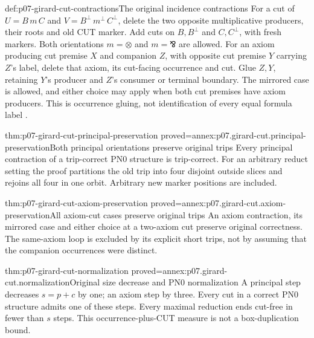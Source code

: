 \begin{hbdefinition}{def:p07-girard-cut-contractions}{The original incidence contractions}
For a cut of \(U=B\,m\,C\) and
\(V=B^\perp\,m^\perp\,C^\perp\), delete the two opposite
multiplicative producers, their roots and old CUT marker.
Add cuts on \(B,B^\perp\) and \(C,C^\perp\), with fresh markers.
Both orientations \(m=\otimes\) and \(m=\bindnasrepma\) are allowed.
For an axiom producing cut premise \(X\) and companion \(Z\), with
opposite cut premise \(Y\) carrying \(Z\)'s label, delete that axiom,
its cut-facing occurrence and cut. Glue \(Z,Y\), retaining \(Y\)'s
producer and \(Z\)'s consumer or terminal boundary.
The mirrored case is allowed, and either choice may apply when both
cut premises have axiom producers. This is occurrence gluing, not
identification of every equal formula label
\cite[pp.~41--42]{Girard1987AuthorHosted}.
\end{hbdefinition}

\begin{hbtheorem}{thm:p07-girard-cut-principal-preservation}
 {proved=annex:p07.girard-cut.principal-preservation}{Both principal orientations preserve original trips}
Every principal contraction of a trip-correct PN0 structure is
trip-correct. For an arbitrary reduct setting the proof partitions the
old trip into four disjoint outside slices and rejoins all four in one
orbit. Arbitrary new marker positions are included.
\end{hbtheorem}

\begin{hbtheorem}{thm:p07-girard-cut-axiom-preservation}
 {proved=annex:p07.girard-cut.axiom-preservation}{All axiom-cut cases preserve original trips}
An axiom contraction, its mirrored case and either choice at a
two-axiom cut preserve original correctness. The same-axiom loop is
excluded by its explicit short trips, not by assuming that the
companion occurrences were distinct.
\end{hbtheorem}

\begin{hbtheorem}{thm:p07-girard-cut-normalization}
 {proved=annex:p07.girard-cut.normalization}{Original size decrease and PN0 normalization}
A principal step decreases \(s=p+c\) by one; an axiom step by three.
Every cut in a correct PN0 structure admits one of these steps.
Every maximal reduction ends cut-free in fewer than \(s\) steps.
This occurrence-plus-CUT measure is not a box-duplication bound.
\end{hbtheorem}


